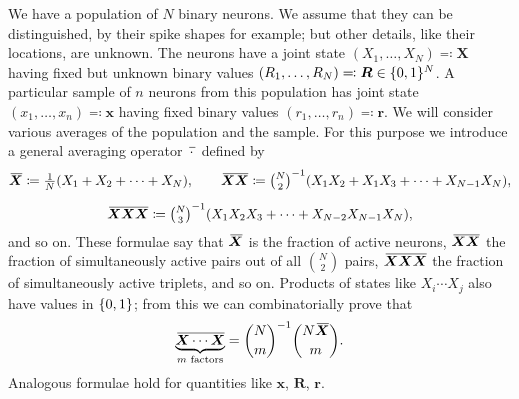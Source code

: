 \documentclass{article}
\theoremstyle{remark}
\theoremstyle{innote}
\newcommand*{\defd}{\coloneqq}
\newcommand*{\defs}{\eqqcolon}
\renewcommand*{\|}{\mathpunct{|}}%
\newcommand*{\dotv}{\mathord{\,\cdot\,}}%
\DeclarePairedDelimiter\set{\{}{\}}
\theoremstyle{simple}
\newtheorem*{simplenote}{}
\newcommand*{\puzzle}{{\fontencoding{U}\fontfamily{fontawesometwo}\selectfont\symbol{225}}}
\newcommand{\mynote}[1]{ {\color{notecolour}\puzzle\ #1}}
\newcommand*{\widebar}[1]{{\mkern1.5mu\skew{2}\overline{\mkern-1.5mu#1\mkern-1.5mu}\mkern 1.5mu}}
\newcommand*{\av}{\widebar} %
\newcommand*{\sav}{\widebar} %
\newcommand*{\yxx}{x}%
\newcommand*{\yx}{\bm{\yxx}}%
\newcommand*{\yX}{\bm{X}}%
\newcommand*{\yXf}{\av{\yX}}%
\newcommand*{\yXXf}{\av{\yX\yX}}%
\newcommand*{\yr}{\bm{r}}%
\newcommand*{\yR}{\bm{R}}%
\begin{document}
We have a population of $N$ binary neurons. We assume that they can be
distinguished, by their spike shapes for example; but other details, like
their locations, are unknown. The neurons have a joint state
$(X_1,\dotsc,X_N) \defs \yX$ having fixed but unknown binary values
$(R_1,\dotsc,R_N)\defs \yR \in \set{0,1}^N$. A particular sample of $n$
neurons from this population has joint state $(x_1, \dotsc, x_n) \defs \yx$
having fixed binary values $(r_1, \dotsc, r_n)\defs\yr$. We will consider
various averages of the population and the sample. For this purpose we
introduce a general averaging operator $\sav{\dotv}$ defined by
\begin{equation}
  \begin{gathered}
    \av{\yX} \defd \tfrac{1}{N} (X_1 + X_2 + \dotsb + X_N),
   \qquad%
    \av{\yX \yX} \defd \tbinom{N}{2}^{-1} (X_1 X_2 + X_1 X_3 + \dotsb +
    X_{N-1} X_N),
    \\[2\jot]
    \av{\yX\yX\yX} \defd \tbinom{N}{3}^{-1} (X_1 X_2 X_3 +%
    \dotsb + X_{N-2} X_{N-1}X_N),
  \end{gathered}
\end{equation}
and so on.
These formulae say that $\yXf$ is the fraction of active neurons, $\yXXf$
the fraction of simultaneously active pairs out of all $\binom{N}{2}$
pairs, $\av{\yX\yX\yX}$ the fraction of simultaneously active triplets, and
so on. Products of states like $X_i \dotsm X_j$ also have values in
$\set{0,1}$; from this we can combinatorially  prove that
\begin{equation}
  \label{eq:products_intermsof_average}
  \av{\underbrace{\yX\dotsm\yX}_{\text{$m$ factors}}}
  = \binom{N}{m}^{-1}\binom{N\yXf}{m}.
\end{equation}
Analogous formulae  hold for quantities like $\yx$, $\yR$, $\yr$.

\end{document}
